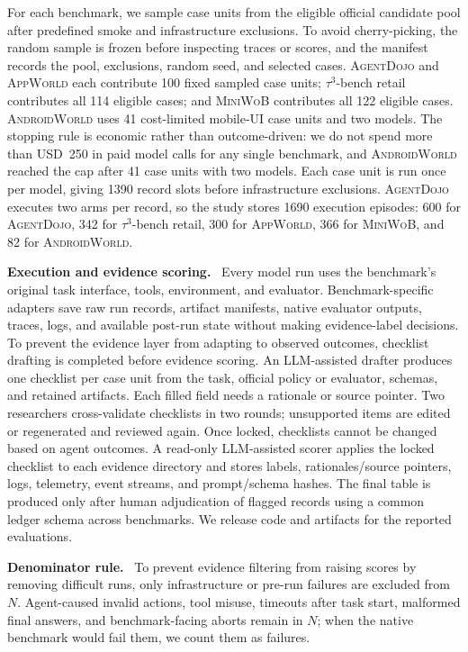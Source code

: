 \documentclass{article}
\newcommand{\agentdojo}{\textsc{AgentDojo}\xspace}
\newcommand{\appworld}{\textsc{AppWorld}\xspace}
\newcommand{\tauthree}{\(\tau^3\)-bench retail\xspace}
\newcommand{\androidworld}{\textsc{AndroidWorld}\xspace}
\newcommand{\miniwob}{\textsc{MiniWoB}\xspace}
\newcommand{\paperupdate}[1]{\textcolor{revisionblue}{#1}}
\newcommand{\runin}[1]{\noindent\textbf{#1}\ }
\begin{document}
For each benchmark, we sample case units from the eligible official candidate
pool after predefined smoke and infrastructure exclusions. To avoid
cherry-picking, the random sample is frozen before inspecting traces or scores,
and the manifest records the pool, exclusions, random seed, and selected cases.
\paperupdate{\agentdojo and \appworld each contribute 100 fixed sampled case
units; \tauthree contributes all 114 eligible cases; and \miniwob contributes
all 122 eligible cases.} \androidworld uses 41 cost-limited
mobile-UI case units and two models. The stopping rule is economic
rather than outcome-driven: we do not spend more than USD~250 in paid model
calls for any single benchmark, and \androidworld reached the cap after 41 case
units with two models. Each case unit is run once per model, giving \paperupdate{1390} record slots
before infrastructure exclusions.
\agentdojo
executes two arms per record, so the study stores \paperupdate{1690} execution episodes:
\paperupdate{600 for \agentdojo, 342 for \tauthree, 300 for \appworld, 366 for
\miniwob, and 82 for}
\androidworld.

\runin{Execution and evidence scoring.}
Every model run uses the benchmark's original task interface, tools,
environment, and evaluator. Benchmark-specific adapters save raw run records,
artifact manifests, native evaluator outputs, traces, logs, and available
post-run state without making evidence-label decisions. To prevent the
evidence layer from adapting to observed outcomes, checklist drafting is
completed before evidence scoring. An LLM-assisted drafter produces one
checklist per case unit from the task, official policy or evaluator, schemas,
and retained artifacts.
Each filled field needs a rationale or source pointer. Two researchers
cross-validate checklists in two rounds; unsupported items are edited or
regenerated and reviewed again. Once locked, checklists cannot be changed based
on agent outcomes. A read-only LLM-assisted scorer applies the locked checklist to each evidence
directory and stores labels, rationales/source pointers, logs, telemetry, event
streams, and prompt/schema hashes. The final table is produced only after human
adjudication of flagged records using a common ledger schema across benchmarks.
We release code and artifacts for the reported evaluations.

\runin{Denominator rule.}
To prevent evidence filtering from raising scores by removing difficult runs,
only infrastructure or pre-run failures are excluded from \(N\). Agent-caused
invalid actions, tool misuse, timeouts after task start, malformed final
answers, and benchmark-facing aborts remain in \(N\); when the native benchmark
would fail them, we count them as failures.
\end{document}
